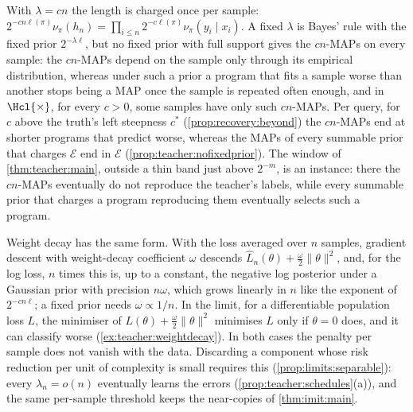 \begin{remark}[$\lambda=cn$ and weight decay]\label{rem:teacher:weightdecay}
With $\lambda=cn$ the length is charged once per sample: $2^{-cn\ell(\pi)}\nu_\pi(h_n)=\prod_{i\le n}2^{-c\ell(\pi)}\nu_\pi(y_i\mid x_i)$. A fixed $\lambda$ is Bayes' rule with the fixed prior $2^{-\lambda\ell}$, but no fixed prior with full support gives the $cn$-MAPs on every sample: the $cn$-MAPs depend on the sample only through its empirical distribution, whereas under such a prior a program that fits a sample worse than another stops being a MAP once the sample is repeated often enough, and in $\Hcl{\times}$, for every $c>0$, some samples have only such $cn$-MAPs. Per query, for $c$ above the truth's left steepness $c^*$ (\cref{prop:recovery:beyond}) the $cn$-MAPs end at shorter programs that predict worse, whereas the MAPs of every summable prior that charges $\mathcal E$ end in $\mathcal E$ (\cref{prop:teacher:nofixedprior}). The window of \cref{thm:teacher:main}, outside a thin band just above $2^{-m}$, is an instance: there the $cn$-MAPs eventually do not reproduce the teacher's labels, while every summable prior that charges a program reproducing them eventually selects such a program.

Weight decay \citep{krogh1992simple} has the same form. With the loss averaged over $n$ samples, gradient descent with weight-decay coefficient $\omega$ descends $\hat L_n(\theta)+\frac\omega2\|\theta\|^2$, and, for the log loss, $n$ times this is, up to a constant, the negative log posterior under a Gaussian prior \citep{mackay1992practical} with precision $n\omega$, which grows linearly in $n$ like the exponent of $2^{-cn\ell}$; a fixed prior needs $\omega\propto1/n$. In the limit, for a differentiable population loss $L$, the minimiser of $L(\theta)+\frac\omega2\|\theta\|^2$ minimises $L$ only if $\theta=0$ does, and it can classify worse (\cref{ex:teacher:weightdecay}). In both cases the penalty per sample does not vanish with the data. Discarding a component whose risk reduction per unit of complexity is small requires this (\cref{prop:limits:separable}): every $\lambda_n=o(n)$ eventually learns the errors (\cref{prop:teacher:schedules}(a)), and the same per-sample threshold keeps the near-copies of \cref{thm:imit:main}.


\end{remark}
